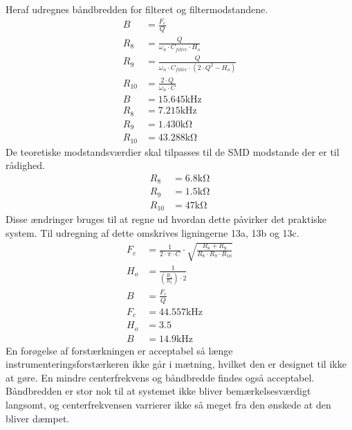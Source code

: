 Heraf udregnes båndbredden for filteret og filtermodstandene. \cite[Side. 209]{Huelsman1993}
\begin{align}
	B & = \frac{F_c}{Q} \\
	R_8 & = \frac{Q}{\omega_n \cdot C_{filter} \cdot H_o } \\
	R_9 & = \frac{Q}{ \omega_n \cdot C_{filter} \cdot \left( 2 \cdot Q^2 - H_o \right) } \\
	R_{10} & = \frac{2 \cdot Q}{ \omega_n \cdot C} \\
	B & = 15.645 \si{\kilo\hertz} \nonumber \\
	R_8 & = 7.215 \si{\kilo\hertz} \nonumber \\
	R_9 & = 1.430 \si{\kilo\ohm} \nonumber \\
	R_{10} & = 43.288 \si{\kilo\ohm} \nonumber 
\end{align}
De teoretiske modstandsværdier skal tilpasses til de SMD modstande der er til rådighed.
\begin{align}
	R_8 & = 6.8 \si{\kilo\ohm} \nonumber \\
	R_9 & = 1.5 \si{\kilo\ohm} \nonumber \\
	R_{10} & = 47 \si{\kilo\ohm} \nonumber
\end{align}
Disse ændringer bruges til at regne ud hvordan dette påvirker det praktiske system. Til udregning af dette omskrives ligningerne 13a, 13b og 13c. \cite[Side. 208]{Huelsman1993}
\begin{align}
	F_c & = \frac{1}{2 \cdot \pi \cdot C} \cdot \sqrt{\frac{R_8+R_9}{R_8 \cdot R_9 \cdot R_{10}}} \\
	H_o & = \frac{1}{\left( \frac{R_1}{R_3} \right) \cdot 2} \\
	B & = \frac{F_c}{Q} \\
	F_c & = 44.557 \si{\kilo\hertz} \nonumber \\
	H_o & = 3.5 \nonumber \\
	B & = 14.9 \si{\kilo\hertz} \nonumber
\end{align}
En forøgelse af forstærkningen er acceptabel så længe instrumenteringsforstærkeren ikke går i mætning, hvilket den er designet til ikke at gøre. En mindre centerfrekvens og båndbredde findes også acceptabel. Båndbredden er stor nok til at systemet ikke bliver bemærkelsesværdigt langsomt, og centerfrekvensen varrierer ikke så meget fra den ønskede at den bliver dæmpet.
